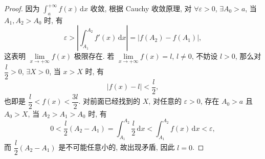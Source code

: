 \documentclass[a4paper, 11pt]{ctexart}
\begin{document}
\begin{enumerate}
        \begin{proof}
            因为 $\displaystyle{\int_a^{+\infty}f(x)\,\mathrm{d}x}$ 收敛, 根据 Cauchy 收敛原理, 对 $\forall \varepsilon > 0$, $\exists A_0 > a$,
            当 $A_1, A_2 > A_0$ 时, 有
            \[
                \varepsilon > \left|\int_{A_1}^{A_2}f'(x)\,\mathrm{d}x\right| = |f(A_2) - f(A_1)|,   
            \]
            这表明 $\lim\limits_{x\to+\infty}f(x)$ 极限存在. 若 $\lim\limits_{x\to+\infty}f(x)=l$, $l \neq 0$, 不妨设 $l > 0$, 那么对 $\dfrac{l}{2} > 0$, $\exists X > 0$,
            当 $x > X$ 时, 有
            \[
                |f(x) - l| < \frac{l}{2},    
            \]
            也即是 $\dfrac{l}{2} < f(x) < \dfrac{3l}{2}$. 对前面已经找到的 $X$, 对任意的 $\varepsilon > 0$, 存在 $A_0 > a$ 且 $A_0 > X$, 当 $A_2 > A_1 > A_0$ 时, 有
            \[
                0 < \frac{l}{2}(A_2 - A_1) = \int_{A_1}^{A_2}\dfrac{l}{2}\,\mathrm{d}x < \int_{A_1}^{A_2}f(x)\,\mathrm{d}x < \varepsilon,  
            \]   
            而 $\dfrac{l}{2}(A_2 - A_1)$ 是不可能任意小的, 故出现矛盾, 因此 $l = 0$.
        \end{proof}
\end{enumerate}
\end{document}
